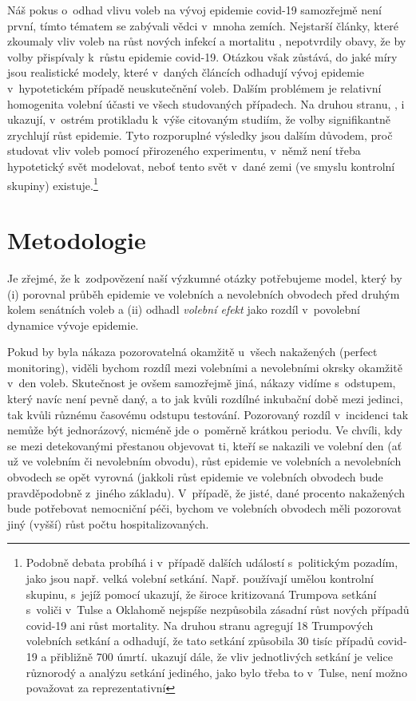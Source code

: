 Náš pokus o~odhad vlivu voleb na vývoj epidemie covid-19 samozřejmě není první, tímto tématem se zabývali vědci v~mnoha zemích. Nejstarší články, které zkoumaly vliv voleb na růst nových infekcí a mortalitu \cite{Berry2020, feltham2020no, AJPH2020}, nepotvrdily obavy, že by volby přispívaly k~růstu epidemie covid-19. Otázkou však zůstává, do jaké míry jsou realistické modely, které v~daných článcích odhadují vývoj epidemie v~hypotetickém případě neuskutečnění voleb. Dalším problémem je relativní homogenita volební účasti ve všech studovaných případech. Na druhou stranu, 
\cite{bertoli_france}, \cite{cotti2020relationship} i \cite{Cassan2020} 
ukazují, v~ostrém protikladu k~výše citovaným studiím, že volby signifikantně zrychlují růst epidemie. Tyto rozporuplné výsledky jsou dalším důvodem, proč studovat vliv voleb pomocí přirozeného experimentu, v~němž není třeba hypotetický svět  modelovat, neboť tento svět v~dané zemi (ve smyslu kontrolní skupiny) existuje.\footnote{Podobně debata probíhá i v~případě dalších událostí s~politickým pozadím, jako jsou např. velká volební setkání. Např. \cite{dave2020risk} používají umělou kontrolní skupinu, s~jejíž pomocí ukazují, že široce kritizovaná Trumpova setkání s~voliči v~Tulse a Oklahomě nejspíše nezpůsobila zásadní růst nových případů covid-19 ani růst mortality. Na druhou stranu  \cite{bernheim2020effects} agregují 18 Trumpových volebních setkání a odhadují, že tato setkání způsobila 30 tisíc případů covid-19 a přibližně 700 úmrtí.  \cite{bernheim2020effects} ukazují dále, že vliv jednotlivých setkání je velice různorodý a analýzu setkání jediného, jako bylo třeba to v~Tulse, není možno považovat za reprezentativní}


\section*{Metodologie}
Je zřejmé, že k~zodpovězení naší výzkumné otázky potřebujeme model, který by (i) porovnal průběh epidemie ve volebních a nevolebních obvodech před druhým kolem senátních voleb a (ii) odhadl {\it volební efekt} jako rozdíl v~povolební dynamice vývoje epidemie.

Pokud by byla nákaza pozorovatelná okamžitě u~všech nakažených (perfect monitoring), viděli bychom rozdíl mezi volebními a nevolebními okrsky okamžitě v~den voleb. Skutečnost je ovšem samozřejmě jiná, nákazy vidíme s~odstupem, který navíc není pevně daný, a to jak kvůli rozdílné inkubační době mezi jedinci, tak kvůli různému časovému odstupu testování. Pozorovaný rozdíl v~incidenci tak nemůže být jednorázový, nicméně jde o~poměrně krátkou periodu. Ve chvíli, kdy se mezi detekovanými přestanou objevovat ti, kteří se nakazili ve volební den (ať už ve volebním či nevolebním obvodu), růst epidemie ve volebních a nevolebních obvodech se opět vyrovná (jakkoli růst epidemie ve volebních obvodech bude pravděpodobně z~jiného základu). V~případě, že jisté, dané procento nakažených bude potřebovat nemocniční péči, bychom ve volebních obvodech měli pozorovat jiný (vyšší) růst počtu hospitalizovaných.  


